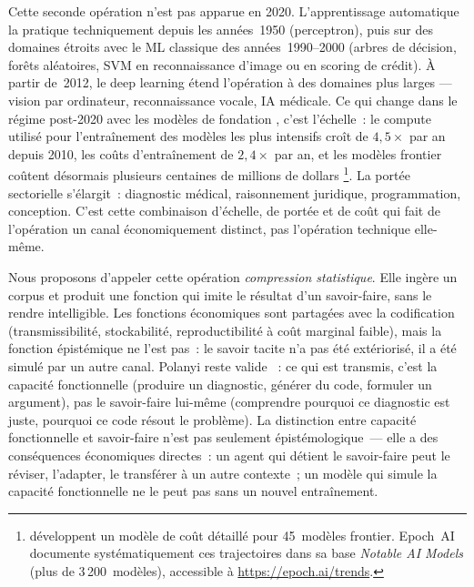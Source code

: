 Cette seconde opération n'est pas apparue en 2020. L'apprentissage automatique la pratique techniquement depuis les années~1950 (perceptron), puis sur des domaines étroits avec le ML classique des années~1990--2000 (arbres de décision, forêts aléatoires, SVM en reconnaissance d'image ou en scoring de crédit). À partir de~2012, le deep learning étend l'opération à des domaines plus larges --- vision par ordinateur, reconnaissance vocale, IA médicale. Ce qui change dans le régime post-2020 avec les modèles de fondation \parencite{brown_language_2020}, c'est l'échelle~: le compute utilisé pour l'entraînement des modèles les plus intensifs croît de $4{,}5\times$ par an depuis 2010, les coûts d'entraînement de $2{,}4\times$ par an, et les modèles frontier coûtent désormais plusieurs centaines de millions de dollars \parencite{cottier_rising_2025}\footnote{\textcite{cottier_rising_2025} développent un modèle de coût détaillé pour 45~modèles frontier. Epoch~AI documente systématiquement ces trajectoires dans sa base \emph{Notable AI Models} (plus de 3\,200~modèles), accessible \`a \url{https://epoch.ai/trends}.}. La portée sectorielle s'élargit~: diagnostic médical, raisonnement juridique, programmation, conception. C'est cette combinaison d'échelle, de portée et de coût qui fait de l'opération un canal économiquement distinct, pas l'opération technique elle-même.

Nous proposons d'appeler cette opération \emph{compression statistique}. Elle ingère un corpus et produit une fonction qui imite le résultat d'un savoir-faire, sans le rendre intelligible. Les fonctions économiques sont partagées avec la codification (transmissibilité, stockabilité, reproductibilité à coût marginal faible), mais la fonction épistémique ne l'est pas~: le savoir tacite n'a pas été extériorisé, il a été simulé par un autre canal. Polanyi reste valide \parencite{polanyi_tacit_1966}~: ce qui est transmis, c'est la capacité fonctionnelle (produire un diagnostic, générer du code, formuler un argument), pas le savoir-faire lui-même (comprendre pourquoi ce diagnostic est juste, pourquoi ce code résout le problème). La distinction entre capacité fonctionnelle et savoir-faire n'est pas seulement épistémologique~--- elle a des conséquences économiques directes~: un agent qui détient le savoir-faire peut le réviser, l'adapter, le transférer à un autre contexte~; un modèle qui simule la capacité fonctionnelle ne le peut pas sans un nouvel entraînement.

